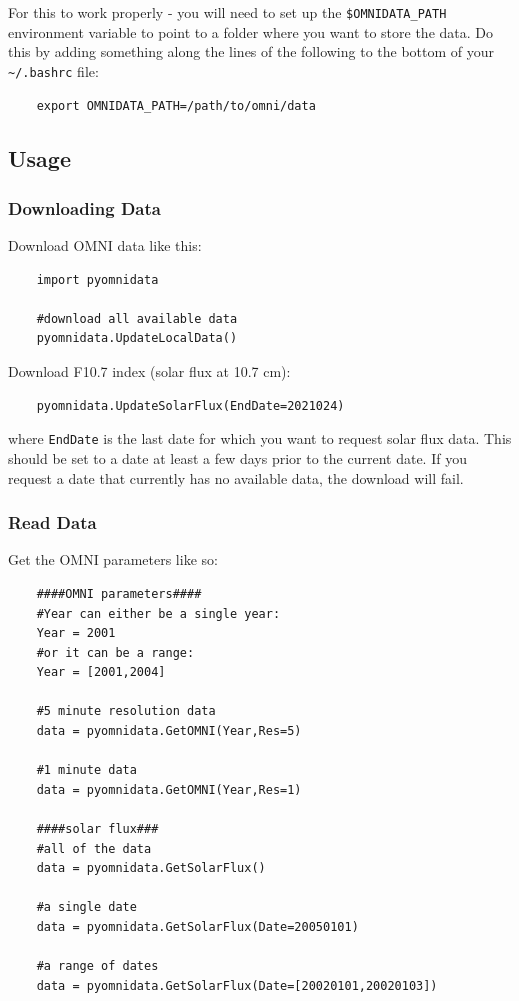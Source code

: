 	For this to work properly - you will need to set up the \texttt{\$OMNIDATA_PATH} environment variable to point to a folder where you want to store the data. Do this by adding something along the lines of the following to the bottom of your \texttt{\~{}/.bashrc} file:
	
	\begin{verbatim}
	export OMNIDATA_PATH=/path/to/omni/data
	\end{verbatim}
	
	\subsection{Usage}
	
	\subsubsection{Downloading Data}
	
	Download OMNI data like this:
	
	\begin{verbatim}
	import pyomnidata
	
	#download all available data
	pyomnidata.UpdateLocalData()
	\end{verbatim}
	
	Download F10.7 index (solar flux at 10.7 cm):
	
	\begin{verbatim}
	pyomnidata.UpdateSolarFlux(EndDate=2021024)
	\end{verbatim}
	
	where \texttt{EndDate} is the last date for which you want to request solar flux data. This should be set to a date at least a few days prior to the current date. If you request a date that currently has no available data, the download will fail.
	
	\subsubsection{Read Data}
	
	Get the OMNI parameters like so:
	
	\begin{verbatim}
	####OMNI parameters####
	#Year can either be a single year:
	Year = 2001
	#or it can be a range:
	Year = [2001,2004]
	
	#5 minute resolution data
	data = pyomnidata.GetOMNI(Year,Res=5)
	
	#1 minute data
	data = pyomnidata.GetOMNI(Year,Res=1)
	
	####solar flux###
	#all of the data
	data = pyomnidata.GetSolarFlux()
	
	#a single date
	data = pyomnidata.GetSolarFlux(Date=20050101)
	
	#a range of dates
	data = pyomnidata.GetSolarFlux(Date=[20020101,20020103])
	\end{verbatim}
	
